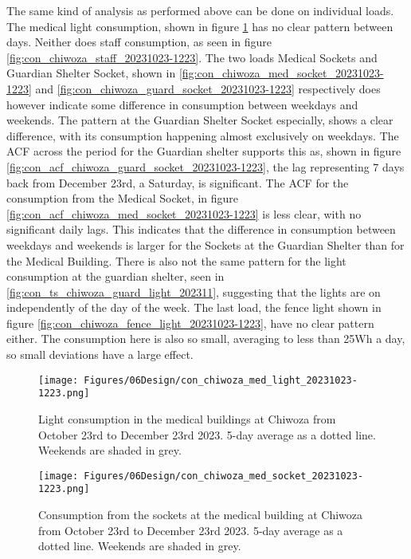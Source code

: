 The same kind of analysis as performed above can be done on individual loads. The medical light consumption, shown in figure \ref{fig:con_chiwoza_med_light_20231023-1223} has no clear pattern between days. Neither does staff consumption, as seen in figure \ref{fig:con_chiwoza_staff_20231023-1223}. The two loads Medical Sockets and Guardian Shelter Socket, shown in \autoref{fig:con_chiwoza_med_socket_20231023-1223} and \autoref{fig:con_chiwoza_guard_socket_20231023-1223} respectively does however indicate some difference in consumption between weekdays and weekends. The pattern at the Guardian Shelter Socket especially, shows a clear difference, with its consumption happening almost exclusively on weekdays. The ACF across the period for the Guardian shelter supports this as, shown in figure \ref{fig:con_acf_chiwoza_guard_socket_20231023-1223}, the lag representing 7 days back from December 23rd, a Saturday, is significant. The ACF for the consumption from the Medical Socket, in figure \ref{fig:con_acf_chiwoza_med_socket_20231023-1223} is less clear, with no significant daily lags. This indicates that the difference in consumption between weekdays and weekends is larger for the Sockets at the Guardian Shelter than for the Medical Building. There is also not the same pattern for the light consumption at the guardian shelter, seen in \ref{fig:con_ts_chiwoza_guard_light_202311}, suggesting that the lights are on independently of the day of the week. The last load, the fence light shown in figure \ref{fig:con_chiwoza_fence_light_20231023-1223}, have no clear pattern either. The consumption here is also so small, averaging to less than 25Wh a day, so small deviations have a large effect. \\

\begin{figure}[]
    \centering
    \texttt{[image: Figures/06Design/con\_chiwoza\_med\_light\_20231023-1223.png]}
    \caption[Medical Light consumption Chiwoza 20231023-1223]{Light consumption in the medical buildings at Chiwoza from October 23rd to December 23rd 2023. 5-day average as a dotted line. Weekends are shaded in grey.}
    \label{fig:con_chiwoza_med_light_20231023-1223}
\end{figure}

\begin{figure}[]
    \centering
    \texttt{[image: Figures/06Design/con\_chiwoza\_med\_socket\_20231023-1223.png]}
    \caption[Medical Socket consumption Chiwoza 20231023-1223]{Consumption from the sockets at the medical building at Chiwoza from October 23rd to December 23rd 2023. 5-day average as a dotted line. Weekends are shaded in grey.}
    \label{fig:con_chiwoza_med_socket_20231023-1223}
\end{figure}

